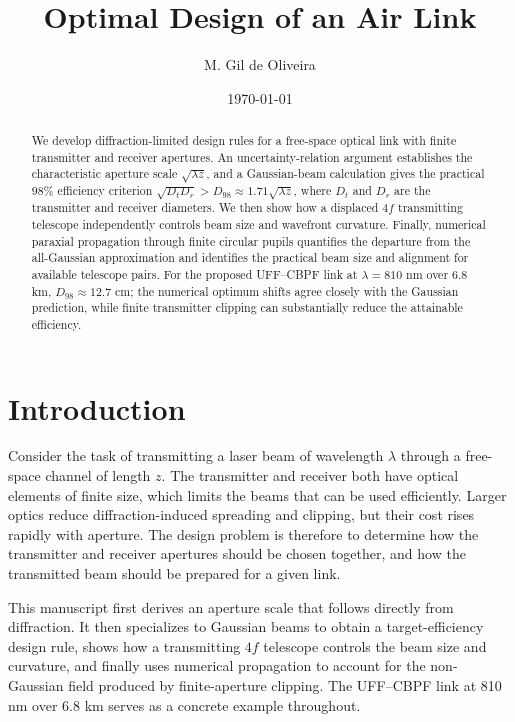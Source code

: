 \documentclass[a4paper,10pt]{article}
\title{Optimal Design of an Air Link}
\author{M. Gil de Oliveira}
\date{\today}
\begin{document}
\maketitle

\begin{abstract}
We develop diffraction-limited design rules for a free-space optical link with finite transmitter and receiver apertures. An uncertainty-relation argument establishes the characteristic aperture scale $\sqrt{\lambda z}$, and a Gaussian-beam calculation gives the practical $98\%$ efficiency criterion $\sqrt{D_tD_r}>D_{98}\approx1.71\sqrt{\lambda z}$, where $D_t$ and $D_r$ are the transmitter and receiver diameters. We then show how a displaced $4f$ transmitting telescope independently controls beam size and wavefront curvature. Finally, numerical paraxial propagation through finite circular pupils quantifies the departure from the all-Gaussian approximation and identifies the practical beam size and alignment for available telescope pairs. For the proposed UFF--CBPF link at $\lambda=810$ nm over 6.8 km, $D_{98}\approx12.7$ cm; the numerical optimum shifts agree closely with the Gaussian prediction, while finite transmitter clipping can substantially reduce the attainable efficiency.
\end{abstract}

\section{Introduction}

Consider the task of transmitting a laser beam of wavelength $\lambda$ through a free-space channel of length $z$. The transmitter and receiver both have optical elements of finite size, which limits the beams that can be used efficiently. Larger optics reduce diffraction-induced spreading and clipping, but their cost rises rapidly with aperture. The design problem is therefore to determine how the transmitter and receiver apertures should be chosen together, and how the transmitted beam should be prepared for a given link.

This manuscript first derives an aperture scale that follows directly from diffraction. It then specializes to Gaussian beams to obtain a target-efficiency design rule, shows how a transmitting $4f$ telescope controls the beam size and curvature, and finally uses numerical propagation to account for the non-Gaussian field produced by finite-aperture clipping. The UFF--CBPF link at 810 nm over 6.8 km serves as a concrete example throughout.
\end{document}
